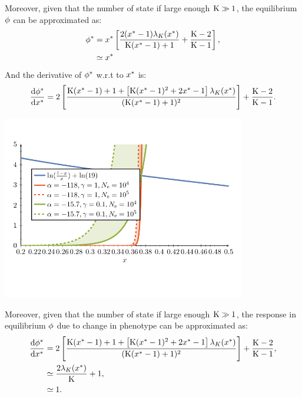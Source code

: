 Moreover, given that the number of state if large enough $\text{K} \gg 1$, the equilibrium $\phi$ can be approximated as:
\begin{align}
\phi^{*}  & = x^{*} \left[ \frac{2 (x^{*}-1)  \lambda_{K}(x^{*}) }{\text{K} (x^{*}-1)+1} + \frac{\text{K} - 2}{\text{K} - 1}\right], \\
& \simeq x^{*}
\end{align}
And the derivative of $\phi^{*}$ w.r.t to $x^{*}$ is: 
\begin{gather}
\frac{\mathrm{d} \phi^{*}}{\mathrm{d} x^{*}} = 2 \left[ \frac{\text{K} (x^{*}- 1) + 1+\left[\text{K} (x^{*}-1)^2+2 x^{*}-1\right] \lambda_{K}(x^{*}) }{(\text{K} (x^{*}-1)+1)^2}\right] + \frac{\text{K} - 2}{\text{K} - 1} \label{eq:dw_dx}.
\end{gather}
\begin{center}
 \includegraphics[width=0.8\textwidth, page=3] {analytical-relaxation}
\end{center}
Moreover, given that the number of state if large enough $\text{K} \gg 1$, the response in equilibrium $\phi$ due to change in phenotype can be approximated as:
\begin{align}
\frac{ \mathrm{d} \phi^{*}}{\mathrm{d} x^{*}}  & = 2 \left[ \frac{\text{K} (x^{*}- 1) + 1+\left[\text{K} (x^{*}-1)^2+2 x^{*}-1\right] \lambda_{K}(x^{*}) }{(\text{K} (x^{*}-1)+1)^2}\right] + \frac{\text{K} - 2}{\text{K} - 1}, \\
& \simeq \frac{2 \lambda_{K}(x^{*})}{\text{K}} + 1, \\
& \simeq 1. \label{eq:approx_domega_dx}
\end{align}
